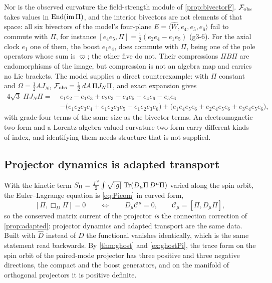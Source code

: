 Nor is the observed curvature the field-strength module of \cref{prop:bivectorF}. $\mathcal F_{\rm obs}$ takes values in $\operatorname{End}(\operatorname{im}\Pi)$, and the interior
bivectors are not elements of that space: all six bivectors of the model's four-plane $E=\langle\widehat W,e_4,e_5,e_6\rangle$ fail to commute with $\Pi$, for instance
$[e_4e_5,\Pi]=\tfrac12(e_2e_4-e_1e_5)$ (g3-6). For the axial clock $e_1$ one of them, the boost $e_1e_4$, does commute with $\Pi$, being one of the pole operators
whose sum is $\varpi$; the other five do not. Their compressions $\Pi B\Pi$
are endomorphisms of the image, but compression is not an algebra map and carries no Lie brackets. The model supplies a direct counterexample: with $\Pi$
constant and $\Omega=\tfrac12AJ_N$, $\mathcal F_{\rm obs}=\tfrac12\,dA\,\Pi J_N\Pi$, and exact expansion gives
\[
\begin{aligned}
4\sqrt3\;\Pi J_N\Pi=\;&e_1e_2-e_1e_3+e_2e_3-e_4e_5+e_4e_6-e_5e_6\\
&-\bigl(e_1e_2e_3e_4+e_1e_2e_3e_5+e_1e_2e_3e_6\bigr)+\bigl(e_1e_4e_5e_6+e_2e_4e_5e_6+e_3e_4e_5e_6\bigr),
\end{aligned}
\]
with grade-four terms of the same size as the bivector terms. An electromagnetic two-form and a Lorentz-algebra-valued curvature two-form carry different
kinds of index, and identifying them needs structure that is not supplied.

\subsection{Projector dynamics is adapted transport}

With the kinetic term $S_\Pi=\tfrac{f^2}2\int\sqrt{|g|}\,\operatorname{Tr}(D_\mu\Pi\,D^\mu\Pi)$ varied along the spin orbit, the Euler--Lagrange equation is \eqref{eq:Pieom} in
curved form,
\[
[\Pi,\Box_D\Pi]=0\qquad\Longleftrightarrow\qquad D_\mu\mathcal C^\mu=0,\qquad \mathcal C_\mu=[\Pi,D_\mu\Pi],
\]
so the conserved matrix current of the projector \emph{is} the connection correction of \cref{prop:adapted}: projector dynamics and adapted transport are the same
data. Built with $\widehat D$ instead of $D$ the functional vanishes identically, which is the same statement read backwards. By \cref{thm:ghost} and
\cref{ex:ghostPi}, the trace form on the spin orbit of the paired-mode projector has three positive and three negative directions, the compact and the boost
generators, and on the manifold of orthogonal projectors it is positive definite.

